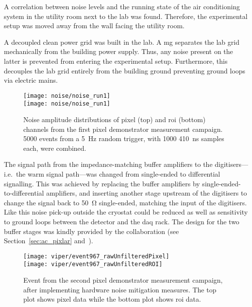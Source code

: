 A correlation between noise levels and the running state of the air conditioning system in the utility room next to the lab was found.
Therefore, the experimental setup was moved away from the wall facing the utility room.

A decoupled clean power grid was built in the lab.
A \gls{mg} separates the lab grid mechanically from the building power supply.
Thus, any noise present on the latter is prevented from entering the experimental setup.
Furthermore, this decouples the lab grid entirely from the building ground preventing ground loops via electric mains.

\begin{figure}[htb]
	\centering
	\texttt{[image: noise/noise\_run1]} \\
	\texttt{[image: noise/noise\_run1]}
	\caption[Noise distributions from first pixel demonstrator measurement campaign]{%
		Noise amplitude distributions of pixel (top) and \acrshort{roi} (bottom) channels from the first pixel demonstrator measurement campaign.
		\num{5000} events from a \SI{5}{\hertz} random trigger, with \num{1000} \SI{410}{\nano\second} samples each, were combined.
	}
	\label{fig:electronics_noise-run1}
\end{figure}

The signal path from the impedance-matching buffer amplifiers to the digitisers---i.e.\ the warm signal path---was changed from single-ended to differential signalling.
This was achieved by replacing the buffer amplifiers by single-ended-to-differential amplifiers, and inserting another stage upstream of the digitisers to change the signal back to \SI{50}{\ohm} single-ended, matching the input of the digitisers.
Like this noise pick-up outside the cryostat could be reduced as well as sensitivity to ground loops between the detector and the \gls{daq} rack.
The design for the two buffer stages was kindly provided by the \lariat{} collaboration (see Section~\ref{sec:ac_pixlar} and~\cite{lariat}).

\begin{figure}[htb]
	\centering
	\texttt{[image: viper/event967\_rawUnfilteredPixel]}\\
	\texttt{[image: viper/event967\_rawUnfilteredROI]}
	\caption[Event from second pixel demonstrator measurement campaign]{%
		Event from the second pixel demonstrator measurement campaign, after implementing hardware noise mitigation measures.
		The top plot shows pixel data while the bottom plot shows \acrshort{roi} data.
	}
	\label{fig:electronics_event-run2}
\end{figure}

